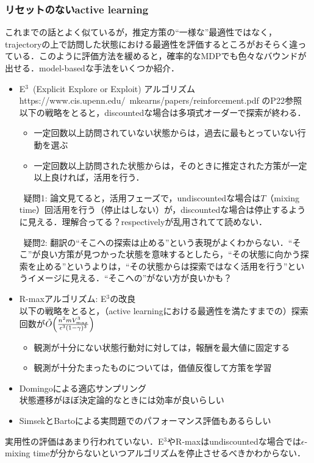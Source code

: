 \documentclass{jsarticle}
\begin{document}
\subsubsection*{リセットのないactive learning}
これまでの話とよく似ているが，推定方策の``一様な''最適性ではなく，trajectoryの上で訪問した状態における最適性を評価するところがおそらく違っている．このように評価方法を緩めると，確率的なMDPでも色々なバウンドが出せる．model-basedな手法をいくつか紹介．

\begin{itemize}
\item{E$^3$\ (Explicit Explore or Exploit) アルゴリズム \\}
https://www.cis.upenn.edu/~mkearns/papers/reinforcement.pdf のP22参照\\
以下の戦略をとると，discountedな場合は多項式オーダーで探索が終わる．
\begin{itemize}
\item{一定回数以上訪問されていない状態からは，過去に最もとっていない行動を選ぶ}
\item{一定回数以上訪問された状態からは，そのときに推定された方策が一定以上良ければ，活用を行う．}
\end{itemize}

\ 疑問1: 論文見てると，活用フェーズで，undiscountedな場合は$T$（mixing time）回活用を行う（停止はしない）が，discountedな場合は停止するように見える．理解合ってる？respectivelyが乱用されてて読めない．

\ 疑問2: 翻訳の``そこへの探索は止める''という表現がよくわからない．``そこ''が良い方策が見つかった状態を意味するとしたら，``その状態に向かう探索を止める''というよりは，``その状態からは探索ではなく活用を行う''というイメージに見える．``そこへの''がない方が良いかも？

\item{R-maxアルゴリズム: E$^3$の改良\\}
以下の戦略をとると，（active learningにおける最適性を満たすまでの）探索回数が$\tilde{O}\Bigl(\frac{n^2mV_{max}^3}{\epsilon^3(1-\gamma)^3}\Bigr)$
\begin{itemize}
\item{観測が十分にない状態行動対に対しては，報酬を最大値に固定する}
\item{観測が十分たまったものについては，価値反復して方策を学習}
\end{itemize}

\item{Domingoによる適応サンプリング\\}
状態遷移がほぼ決定論的なときには効率が良いらしい
\item{SimsekとBartoによる実問題でのパフォーマンス評価もあるらしい}
\end{itemize}
実用性の評価はあまり行われていない．E$^3$やR-maxはundiscountedな場合では$\epsilon$-mixing timeが分からないといつアルゴリズムを停止させるべきかわからない．
\end{document}
